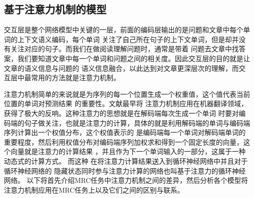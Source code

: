 \subsection{基于注意力机制的模型}
交互层是整个网络模型中关键的一层，前面的编码层输出的是问题和文章中每个单词的上下文语义编码，每个单词
关注了自己所在句子的上下文单词，但是却并没有关注对应的句子。而我们在做阅读理解问题时，通常是带着
问题去文章中找答案，我们要知道文章中每一个单词和问题之间的相关度。因此交互层的目的就是让文章的语义信息与问题的
语义信息融合，以此达到对文章更深层次的理解，而交互层中最常用的方法就是注意力机制。

注意力机制简单的来说就是为序列的每一个位置生成一个权重值，这个值代表当前位置的单词对预测结果
的重要性。文献\cite{neural machine translation by jointly learning to align and translate}最早将
注意力机制应用在机器翻译领域，获得了极大的反响。这种注意力的思想就是在解码端每次生成一个单词
时要对编码端的句子做关注，也就是注意力的计算，具体的就是利用解码端的单词与编码端序列计算出一个权值分布，这个权值表示的
是编码端每一个单词对解码端单词的重要程度，然后利用权值分布对编码端序列加权求和得到一个固定长度的向量，这个向量就是注意力的计算结果
，并且作为下一个单词输入的一部分，这属于一种动态式的计算方式。
而这种
在将注意力计算结果送入到循环神经网络中并且对于循环神经网络的
隐藏状态同时参与注意力计算的网络也叫基于注意力的循环神经网络。
以下将首先介绍MRC任务中注意力机制之间的差异，然后分析各个模型将注意力机制应用在MRC任务上以及它们之间的区别与联系。

